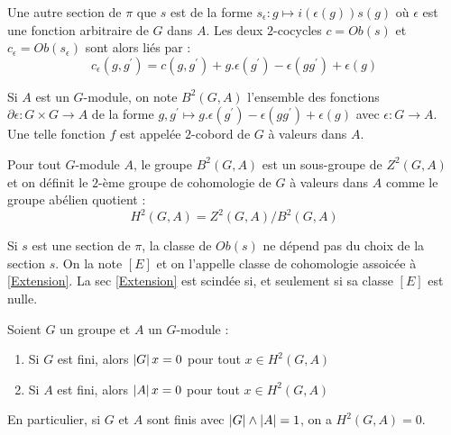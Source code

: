 \documentclass{cours}
\begin{document}
Une autre section de $\pi$ que $s$ est de la forme $s_{\epsilon} : g \mapsto i(\epsilon(g))s(g)$ où $\epsilon$ est une fonction arbitraire de $G$ dans $A$. Les deux $2$-cocycles $c = Ob(s)$ et $c_{\epsilon} = Ob(s_{\epsilon})$ sont alors liés par : 
\[
    c_{\epsilon}(g, g^{'}) = c(g, g^{'}) + g.\epsilon(g^{'}) - \epsilon(gg^{'}) + \epsilon(g)    
\]

\begin{definition}
    Si $A$ est un $G$-module, on note $B^{2}(G, A)$ l'ensemble des fonctions $\partial\epsilon : G \times G \rightarrow A$ de la forme $g, g^{'} \mapsto g.\epsilon(g^{'}) - \epsilon(gg^{'}) + \epsilon(g)$ avec $\epsilon : G\rightarrow A$. Une telle fonction $f$ est appelée $2$-cobord de $G$ à valeurs dans $A$.
\end{definition} 

\begin{definition}
    Pour tout $G$-module $A$, le groupe $B^{2}(G, A)$ est un sous-groupe de $Z^{2}(G, A)$ et on définit le $2$-ème groupe de cohomologie de $G$ à valeurs dans $A$ comme le groupe abélien quotient : 
    \[
        H^{2}(G, A) = Z^{2}(G, A)/B^{2}(G, A)
    \]
\end{definition}

\begin{proposition}
    Si $s$ est une section de $\pi$, la classe de $Ob(s)$ ne dépend pas du choix de la section $s$. On la note $\left[E\right]$ et on l'appelle classe de cohomologie assoicée à \ref{Extension}. La sec \ref{Extension} est scindée si, et seulement si sa classe $\left[E\right]$ est nulle. 
\end{proposition}

\begin{theorem}
    Soient $G$ un groupe et $A$ un $G$-module : 
    \begin{enumerate}
        \item Si $G$ est fini, alors $\left|G\right|x = 0$ pour tout $x \in H^{2}(G, A)$
        \item Si $A$ est fini, alors $\left|A\right|x = 0$ pour tout $x \in H^{2}(G, A)$
    \end{enumerate}
    En particulier, si $G$ et $A$ sont finis avec $\left|G\right| \wedge \left|A\right| = 1$, on a $H^{2}(G, A) = 0$.
\end{theorem}
\end{document}
